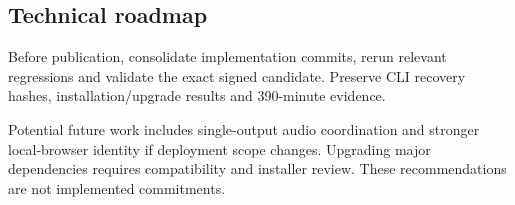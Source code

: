 \subsection{Technical roadmap}

Before publication, consolidate implementation commits, rerun relevant regressions and validate the exact signed candidate. Preserve CLI recovery hashes, installation/upgrade results and 390-minute evidence.

Potential future work includes single-output audio coordination and stronger local-browser identity if deployment scope changes. Upgrading major dependencies requires compatibility and installer review. These recommendations are not implemented commitments.
